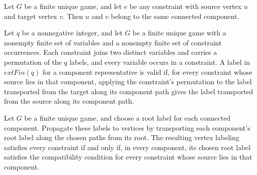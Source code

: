 \begin{theorem}
\label{FABL.FiniteUniqueGame.component_source_eq_target}
\leanok
{}
Let $G$ be a finite unique game, and let $e$ be any constraint with source vertex $u$
and target vertex $v$. Then $u$ and $v$ belong to the same connected component.
\end{theorem}

\begin{definition}
\label{FABL.FiniteUniqueGame.ComponentRootLabelValid}
\leanok
{}
Let $q$ be a nonnegative integer, and let $G$ be a finite unique game with a nonempty
finite set of variables and a nonempty finite set of constraint occurrences. Each
constraint joins two distinct variables and carries a permutation of the $q$ labels, and
every variable occurs in a constraint. A label in $	ext{Fin}(q)$ for a component
representative is valid if, for every constraint whose source lies in that component,
applying the constraint's permutation to the label transported from the target along its
component path gives the label transported from the source along its component path.
\end{definition}

\begin{theorem}
\label{FABL.FiniteUniqueGame.fullySatisfied_propagatedLabel_iff}
\leanok
{}
Let $G$ be a finite unique game, and choose a root label for each connected component.
Propagate these labels to vertices by transporting each component's root label along the
chosen paths from its root. The resulting vertex labeling satisfies every constraint if
and only if, in every component, its chosen root label satisfies the compatibility
condition for every constraint whose source lies in that component.
\end{theorem}

